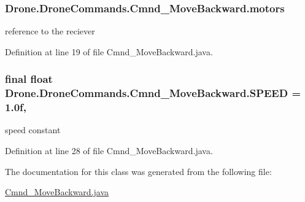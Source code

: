 \subsubsection[{motors}]{ Drone.\+Drone\+Commands.\+Cmnd\+\_\+\+Move\+Backward.\+motors\hspace{0.3cm}{\ttfamily [private]}}\label{class_drone_1_1_drone_commands_1_1_cmnd___move_backward_a5cf26b01ac06582a0f4266dc43636472}
reference to the reciever 

Definition at line 19 of file Cmnd\+\_\+\+Move\+Backward.\+java.

\hypertarget{class_drone_1_1_drone_commands_1_1_cmnd___move_backward_ac466e98dfc44cc00aedefcf3a1695c78}{}
\subsubsection[{S\+P\+E\+E\+D}]{\setlength{\rightskip}{0pt plus 5cm}final float Drone.\+Drone\+Commands.\+Cmnd\+\_\+\+Move\+Backward.\+S\+P\+E\+E\+D = 1.\+0f\hspace{0.3cm}{\ttfamily [static]}, {\ttfamily [private]}}\label{class_drone_1_1_drone_commands_1_1_cmnd___move_backward_ac466e98dfc44cc00aedefcf3a1695c78}
speed constant 

Definition at line 28 of file Cmnd\+\_\+\+Move\+Backward.\+java.



The documentation for this class was generated from the following file\+:\begin{DoxyCompactItemize}
\item 
\hyperlink{_cmnd___move_backward_8java}{Cmnd\+\_\+\+Move\+Backward.\+java}\end{DoxyCompactItemize}
